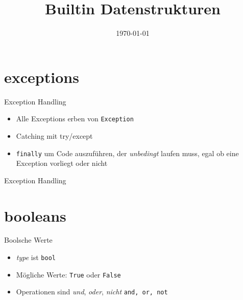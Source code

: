 \usepackage[utf8]{inputenc}

\newcommand{\topic}{
	Builtin Datenstrukturen
}

\title{\topic}
\supertitle{\course}
\date{\today}



\maketitle

\begin{frame}
	\tableofcontents
\end{frame}

\section{exceptions}
\begin{frame}{Exception Handling}
\begin{itemize}
	\item Alle Exceptions erben von \texttt{Exception}
	\item Catching mit try/except
	\item \texttt{finally} um Code auszuf\"uhren, der \textit{unbedingt} laufen muss, egal ob eine Exception vorliegt oder nicht
\end{itemize}
\end{frame}
\begin{frame}{Exception Handling}

\end{frame}

\section{booleans}
\begin{frame}{Boolsche Werte}
\begin{itemize}
	\item \textit{type} ist \texttt{bool}
	\item Mögliche Werte: \texttt{True} oder \texttt{False}
	\item Operationen sind \textit{und}, \textit{oder}, \textit{nicht} \texttt{and, or, not}
\end{itemize}
\end{frame}

